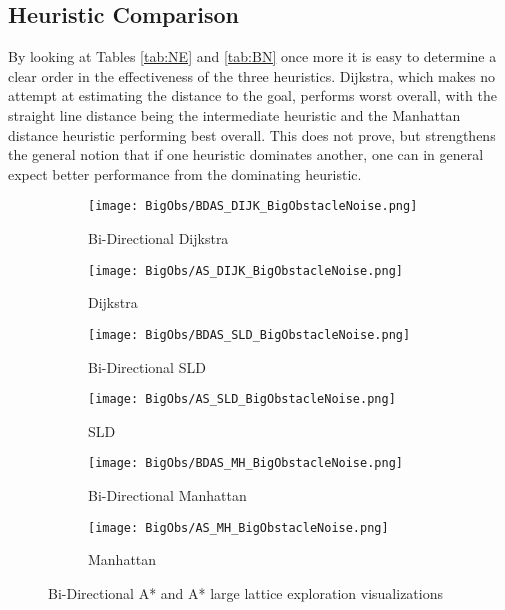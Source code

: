 \documentclass[conference]{IEEEtran}
\begin{document}
\subsection{Heuristic Comparison}
By looking at Tables \ref{tab:NE} and \ref{tab:BN} once more it is easy to determine a clear order in the effectiveness of the three heuristics. Dijkstra, which makes no attempt at estimating the distance to the goal, performs worst overall, with the straight line distance being the intermediate heuristic and the Manhattan distance heuristic performing best overall. This does not prove, but strengthens the general notion that if one heuristic dominates another, one can in general expect better performance from the dominating heuristic.

\begin{figure}[ht]
    \centering
    \begin{subfigure}{.23\textwidth}
        \texttt{[image: BigObs/BDAS\_DIJK\_BigObstacleNoise.png]}
        \caption{Bi-Directional Dijkstra}
    \end{subfigure} \hfill
    \begin{subfigure}{.23\textwidth}
        \texttt{[image: BigObs/AS\_DIJK\_BigObstacleNoise.png]}
        \caption{Dijkstra}
    \end{subfigure} \hfill
    \begin{subfigure}{.23\textwidth}
        \texttt{[image: BigObs/BDAS\_SLD\_BigObstacleNoise.png]}
        \caption{Bi-Directional SLD}
    \end{subfigure} \hfill
     \begin{subfigure}{.23\textwidth}
        \texttt{[image: BigObs/AS\_SLD\_BigObstacleNoise.png]}
        \caption{SLD}
    \end{subfigure} \hfill
    \begin{subfigure}{.23\textwidth}
        \texttt{[image: BigObs/BDAS\_MH\_BigObstacleNoise.png]}
        \caption{Bi-Directional Manhattan}
    \end{subfigure} \hfill
    \begin{subfigure}{.23\textwidth}
        \texttt{[image: BigObs/AS\_MH\_BigObstacleNoise.png]}
        \caption{Manhattan}
    \end{subfigure} \hfill
    \caption{Bi-Directional A* and A* large lattice exploration visualizations}    
    \label{fig:BO}
\end{figure}
\end{document}
